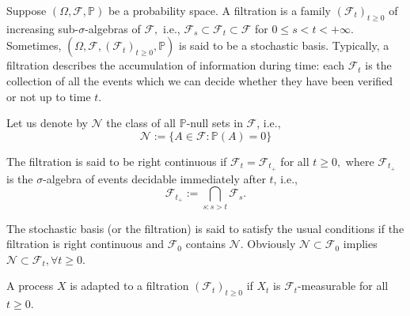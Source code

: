 Suppose $(\Omega, \mathcal{F}, \mathbb{P})$ be a probability space. A filtration is a family $\left(\mathcal{F}_{t}\right)_{t \geq 0}$ of increasing sub-$\sigma$-algebras of $\mathcal{F},$ i.e., $\mathcal{F}_{s} \subset \mathcal{F}_{t} \subset \mathcal{F}$ for $0 \leq s<t<+\infty .$ Sometimes, $\left(\Omega, \mathcal{F},\left(\mathcal{F}_{t}\right)_{t \geq 0}, \mathbb{P}\right)$ is said to be a stochastic basis. Typically, a filtration describes the accumulation of information during time: each $\mathcal{F}_{t}$ is the collection of all the events which we can decide whether they have been verified or not up to time $t .$

Let us denote by $\mathcal{N}$ the class of all $\mathbb{P}$-null sets in $\mathcal{F}$, i.e., \[ \mathcal{N}:=\{A \in \mathcal{F}: \mathbb{P}(A)=0\} \]
\begin{definition}
	The filtration is said to be right continuous if $\mathcal{F}_{t}=\mathcal{F}_{t_{+}}$ for all $t \geq 0,$ where $\mathcal{F}_{t_{+}}$ is the $\sigma$-algebra of events decidable immediately after $t$, i.e., \[ \mathcal{F}_{t_{+}}:=\bigcap_{s: s>t} \mathcal{F}_{s} .\]

	The stochastic basis (or the filtration) is said to satisfy the usual conditions if the filtration is right continuous and $\mathcal{F}_{0}$ contains $\mathcal{N}$. Obviously $\mathcal{N} \subset \mathcal{F}_{0}$ implies $\mathcal{N} \subset \mathcal{F}_{t}, \forall t \geq 0$.
\end{definition}


\begin{definition}
	A process $X$ is adapted to a filtration $\left(\mathcal{F}_{t}\right)_{t \geq 0}$ if $X_{t}$ is $\mathcal{F}_{t}$-measurable for all $t \geq 0$.
\end{definition}
%

